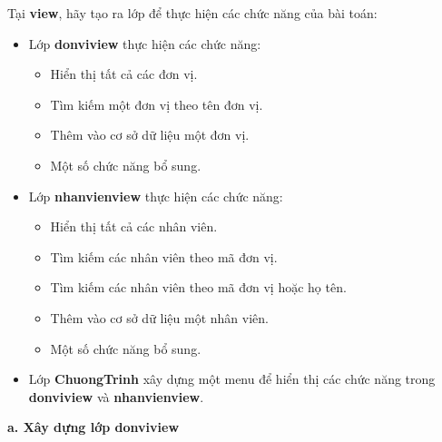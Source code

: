  Tại \textbf{view}, hãy tạo ra lớp để thực hiện các chức năng của bài toán: 
 \begin{itemize}
 	\item Lớp \textbf{donviview} thực hiện các chức năng:
 	 \begin{itemize}
 	 	\item Hiển thị tất cả các đơn vị.
 	 	\item Tìm kiếm một đơn vị theo tên đơn vị.
 	 	\item Thêm vào cơ sở dữ liệu một đơn vị.
 	 	\item Một số chức năng bổ sung.
 	 \end{itemize}
  	\item Lớp \textbf{nhanvienview} thực hiện các chức năng: 
 \begin{itemize}
	\item Hiển thị tất cả các nhân viên.
	\item Tìm kiếm các nhân viên theo mã đơn vị.
	\item Tìm kiếm các nhân viên theo mã đơn vị hoặc họ tên.
	\item Thêm vào cơ sở dữ liệu một nhân viên.
	\item Một số chức năng bổ sung.
\end{itemize}
	\item Lớp \textbf{ChuongTrinh} xây dựng một menu để hiển thị các chức năng trong \textbf{donviview} và \textbf{nhanvienview}.
 \end{itemize}
 \textbf{ a. Xây dựng lớp donviview}
